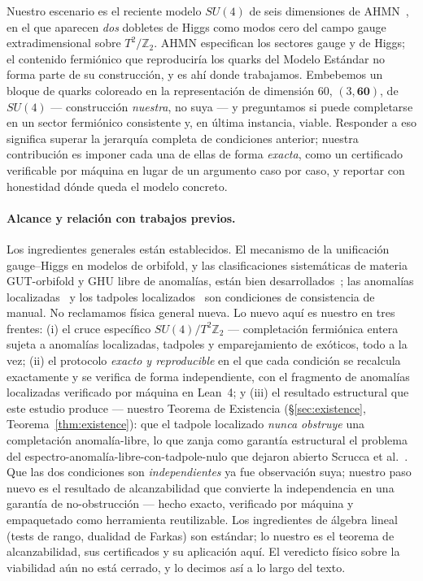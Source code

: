 \documentclass[11pt,a4paper]{article}
\begin{document}
Nuestro escenario es el reciente modelo $SU(4)$ de seis dimensiones de AHMN~\cite{AHMN},
en el que aparecen \emph{dos} dobletes de Higgs como modos cero del campo gauge
extradimensional sobre $T^2/\mathbb{Z}_2$. AHMN especifican los sectores gauge y de
Higgs; el contenido fermi\'onico que reproducir\'ia los quarks del Modelo Est\'andar no
forma parte de su construcci\'on, y es ah\'i donde trabajamos. Embebemos un bloque de
quarks coloreado en la representaci\'on de dimensi\'on $60$, $(3,\mathbf{60})$, de
$SU(4)$ --- construcci\'on \emph{nuestra}, no suya --- y preguntamos si puede
completarse en un sector fermi\'onico consistente y, en \'ultima instancia, viable.
Responder a eso significa superar la jerarqu\'ia completa de condiciones anterior;
nuestra contribuci\'on es imponer cada una de ellas de forma \emph{exacta}, como un
certificado verificable por m\'aquina en lugar de un argumento caso por caso, y reportar
con honestidad d\'onde queda el modelo concreto.

\paragraph{Alcance y relaci\'on con trabajos previos.} Los ingredientes generales est\'an
establecidos. El mecanismo de la unificaci\'on gauge--Higgs en modelos de orbifold, y las
clasificaciones sistem\'aticas de materia GUT-orbifold y GHU libre de anomal\'ias, est\'an
bien desarrollados~\cite{SSSW,Kawamura,aGUT,SU6GHGUT}; las anomal\'ias
localizadas~\cite{ACG,GdVQ,GdV6D} y los tadpoles localizados~\cite{BiggioQ} son
condiciones de consistencia de manual. No reclamamos f\'isica general nueva. Lo nuevo
aqu\'i es nuestro en tres frentes: (i) el cruce espec\'ifico $SU(4)/T^2\mathbb{Z}_2$ ---
completaci\'on fermi\'onica entera sujeta a anomal\'ias localizadas, tadpoles y
emparejamiento de ex\'oticos, todo a la vez; (ii) el protocolo \emph{exacto y reproducible}
en el que cada condici\'on se recalcula exactamente y se verifica de forma independiente,
con el fragmento de anomal\'ias localizadas verificado por m\'aquina en Lean~4; y (iii) el
resultado estructural que este estudio produce --- nuestro Teorema de Existencia
(\S\ref{sec:existence}, Teorema~\ref{thm:existence}): que el tadpole localizado
\emph{nunca obstruye} una completaci\'on anomal\'ia-libre, lo que zanja como garant\'ia
estructural el problema del espectro-anomal\'ia-libre-con-tadpole-nulo que dejaron abierto
Scrucca et al.~\cite{SSSW}. Que las dos condiciones son \emph{independientes} ya fue
observaci\'on suya; nuestro paso nuevo es el resultado de alcanzabilidad que convierte la
independencia en una garant\'ia de no-obstrucci\'on --- hecho exacto, verificado por
m\'aquina y empaquetado como herramienta reutilizable. Los ingredientes de \'algebra
lineal (tests de rango, dualidad de Farkas) son est\'andar; lo nuestro es el teorema de
alcanzabilidad, sus certificados y su aplicaci\'on aqu\'i. El veredicto f\'isico sobre la
viabilidad a\'un no est\'a cerrado, y lo decimos as\'i a lo largo del texto.
\end{document}
